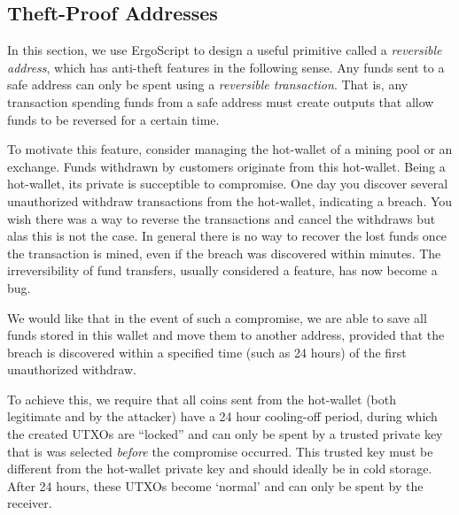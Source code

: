 \documentclass[11pt]{article}
\newcommand{\langname}{ErgoScript\xspace}
\begin{document}
\subsection{Theft-Proof Addresses}

In this section, we use \langname to design a useful primitive called a {\em reversible address}, which has anti-theft features in the following sense.
Any funds sent to a safe address can only be spent using a {\em reversible transaction}. That is, any transaction spending funds from a safe address must create outputs that allow funds to be reversed for a certain time. 

To motivate this feature, consider managing the hot-wallet of a mining pool or an exchange. Funds withdrawn by customers originate from this hot-wallet. Being a hot-wallet, its private is succeptible to compromise. One day you discover several unauthorized withdraw transactions from the hot-wallet, indicating a breach. You wish there was a way to reverse the transactions and cancel the withdraws but alas this is not the case. In general there is no way to recover the lost funds once the transaction is mined, even if the breach was discovered within minutes. The irreversibility of fund transfers, usually considered a feature, has now become a bug.

We would like that in the event of such a compromise, we are able to save all funds stored in this wallet and move them to another address, provided that the breach is discovered within a specified time (such as 24 hours) of the first unauthorized withdraw. 

To achieve this, we require that all coins sent from the hot-wallet (both legitimate and by the attacker)
have a 24 hour cooling-off period, during which the created UTXOs are ``locked'' and can only be spent by a trusted private key that is was selected {\em before} the compromise occurred. This trusted key must be different from the hot-wallet private key and should ideally be in cold storage. 
After 24 hours, these UTXOs become `normal' and can only be spent by the receiver.
\end{document}

